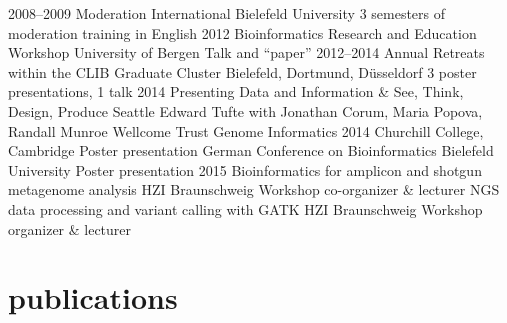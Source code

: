 \documentclass[print]{friggeri-cv}
\begin{document}
\begin{entrylist}
\entry
{2008--2009}
{Moderation International}
{Bielefeld University}
{3 semesters of moderation training in English}
\entry
{2012}
{Bioinformatics Research and Education Workshop}
{University of Bergen}
{Talk and ``paper''}
\entry
{2012--2014}
{Annual Retreats {\normalfont within the CLIB Graduate Cluster}}
{Bielefeld, Dortmund, Düsseldorf}
{3 poster presentations, 1 talk}
\entry
{2014}
{Presenting Data and Information \& See, Think, Design, Produce}
{Seattle}
{Edward Tufte with Jonathan Corum, Maria Popova, Randall Munroe}
\entry
{}
{Wellcome Trust Genome Informatics 2014}
{Churchill College, Cambridge}
{Poster presentation}
\entry
{}
{German Conference on Bioinformatics}
{Bielefeld University}
{Poster presentation}
\entry
{2015}
{Bioinformatics for amplicon and shotgun metagenome analysis}
{HZI Braunschweig}
{Workshop co-organizer \& lecturer}
\entry
{}
{NGS data processing and variant calling with GATK}
{HZI Braunschweig}
{Workshop organizer \& lecturer}
\end{entrylist}


\section{publications}
\end{document}

